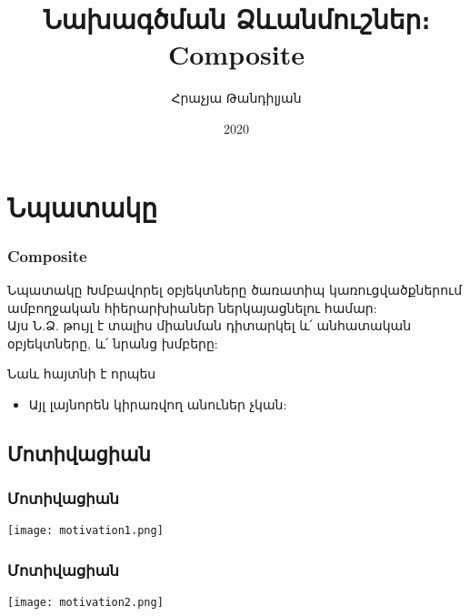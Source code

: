 \documentclass{beamer}
\begin{document}
\title[Composite]{Նախագծման Ձևանմուշներ։ Composite}
\author[Հրաչյա Թանդիլյան\copyright]{Հրաչյա Թանդիլյան}
\date{2020}

\begin{frame}
\titlepage
\end{frame}

\section{Նպատակը}
\begin{frame}\frametitle{Composite}
\begin{block}{Նպատակը}
    Խմբավորել օբյեկտները ծառատիպ կառուցվածքներում ամբողջական հիերարխիաներ
    ներկայացնելու համար: \\ Այս Ն.Ձ. թույլ է տալիս միանման դիտարկել և՛ անհատական
    օբյեկտները, և՛ նրանց խմբերը:
\end{block}
\vfill
Նաև հայտնի է որպես
\begin{itemize}
    \item Այլ լայնորեն կիրառվող անուներ չկան:
\end{itemize}
\end{frame}

\subsection{Մոտիվացիան}
\begin{frame}\frametitle{Մոտիվացիան}
\begin{center}
    \texttt{[image: motivation1.png]}
\end{center}
\end{frame}

\begin{frame}\frametitle{Մոտիվացիան}
\begin{center}
    \texttt{[image: motivation2.png]}
\end{center}
\end{frame}
\end{document}
